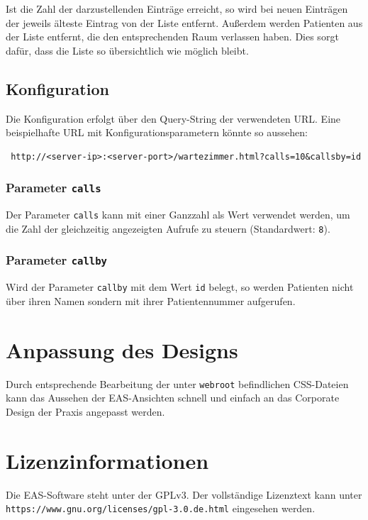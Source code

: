 \documentclass[a4paper,10pt]{scrreprt}
\begin{document}
Ist die Zahl der darzustellenden Einträge erreicht, so wird bei neuen Einträgen der jeweils älteste Eintrag von der Liste entfernt. Außerdem werden Patienten aus der Liste entfernt, die den entsprechenden Raum verlassen haben. Dies sorgt dafür, dass die Liste so übersichtlich wie möglich bleibt.

\section{Konfiguration}
Die Konfiguration erfolgt über den Query-String der verwendeten URL. 
Eine beispielhafte URL mit Konfigurationsparametern könnte so aussehen:
\begin{lstlisting}
 http://<server-ip>:<server-port>/wartezimmer.html?calls=10&callsby=id
\end{lstlisting}

\subsection{Parameter \texttt{calls}}
Der Parameter \texttt{calls} kann mit einer Ganzzahl als Wert verwendet werden, um die Zahl der gleichzeitig angezeigten Aufrufe zu steuern (Standardwert: \texttt{8}). 

\subsection{Parameter \texttt{callby}}
Wird der Parameter \texttt{callby} mit dem Wert \texttt{id} belegt, so werden Patienten nicht über ihren Namen sondern mit ihrer Patientennummer aufgerufen.

\chapter{Anpassung des Designs}
Durch entsprechende Bearbeitung der unter \texttt{webroot} befindlichen CSS-Dateien kann das Aussehen der EAS-Ansichten schnell und einfach an das Corporate Design der Praxis angepasst werden.

\appendix
\chapter{Lizenzinformationen}
Die EAS-Software steht unter der GPLv3. Der vollständige Lizenztext kann unter \texttt{https://www.gnu.org/licenses/gpl-3.0.de.html} eingesehen werden.
\end{document}
